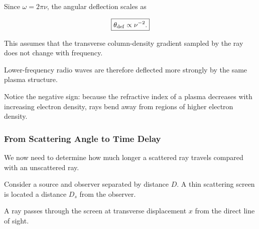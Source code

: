 Since $\omega=2\pi\nu$, the angular
deflection scales as

\begin{equation}
\boxed{
\theta_{\rm def}\propto\nu^{-2}.
}
\end{equation}

This assumes that the transverse column-density
gradient sampled by the ray does not change
with frequency.

Lower-frequency radio waves are therefore
deflected more strongly by the same plasma structure.

Notice the negative sign: because the refractive
index of a plasma decreases with increasing
electron density, rays bend away from regions
of higher electron density.

\subsubsection{From Scattering Angle to Time Delay}

We now need to determine how much longer a
scattered ray travels compared with an
unscattered ray.

Consider a source and observer separated by
distance $D$. A thin scattering screen is
located a distance $D_s$ from the observer.

A ray passes through the screen at transverse
displacement $x$ from the direct line of sight.

\begin{center}
\end{center}

